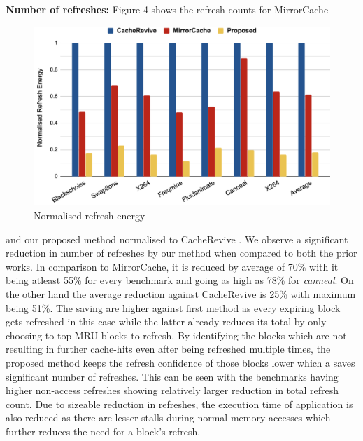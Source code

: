 \documentclass[sigconf]{acmart}
\begin{document}
\textbf{Number of refreshes:} Figure 4 shows the refresh counts for MirrorCache
\begin{figure}[t]
\includegraphics[width=\columnwidth]{res/ref_energy.png}
\caption{Normalised refresh energy}
\end{figure}
and our proposed method normalised to CacheRevive \cite{cache_revive}. 
We observe a significant reduction in number of refreshes by our method when compared to both the prior works. In comparison to MirrorCache, it is reduced by average of 70\% with it being atleast 55\% for every benchmark and going as high as 78\% for \textit{canneal}. On the other hand the average reduction against CacheRevive is 25\% with maximum being 51\%. The saving are higher against first method as every expiring block gets refreshed in this case while the latter already reduces its total by only choosing to top MRU blocks to refresh. By identifying the  blocks which are not resulting in further cache-hits even after being refreshed multiple times, the proposed method keeps the refresh confidence of those blocks lower which a saves significant number of refreshes. This can be seen with the benchmarks having higher non-access refreshes showing relatively larger reduction in total refresh count. Due to sizeable reduction in refreshes, the execution time of application is also reduced as there are lesser stalls during normal memory accesses which further reduces the need for a block's refresh.\vspace{1em}
\end{document}
